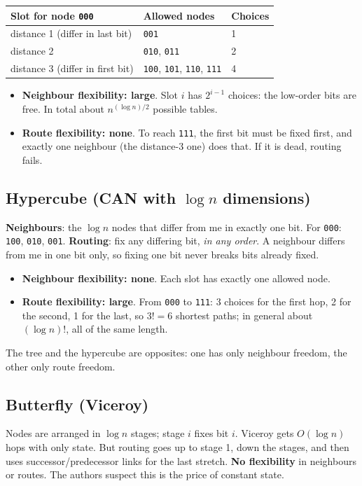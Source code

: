 \begin{center}
\small
\begin{tabular}{@{}lll@{}}
\toprule
Slot for node \texttt{000} & Allowed nodes & Choices\\
\midrule
distance 1 (differ in last bit) & \texttt{001} & 1\\
distance 2 & \texttt{010}, \texttt{011} & 2\\
distance 3 (differ in first bit) & \texttt{100}, \texttt{101}, \texttt{110}, \texttt{111} & 4\\
\bottomrule
\end{tabular}
\end{center}
\begin{itemize}
  \item \textbf{Neighbour flexibility: large}. Slot $i$ has $2^{i-1}$ choices: the low-order bits are free. In total about $n^{(\log n)/2}$ possible tables.
  \item \textbf{Route flexibility: none}. To reach \texttt{111}, the first bit must be fixed first, and exactly one neighbour (the distance-3 one) does that.
        If it is dead, routing fails.
\end{itemize}

\subsection{Hypercube (CAN with $\log n$ dimensions)}
\textbf{Neighbours}: the $\log n$ nodes that differ from me in exactly one bit. For \texttt{000}: \texttt{100}, \texttt{010}, \texttt{001}.
\textbf{Routing}: fix any differing bit, \emph{in any order}. A neighbour differs from me in one bit only, so fixing one bit never breaks bits already fixed.
\begin{itemize}
  \item \textbf{Neighbour flexibility: none}. Each slot has exactly one allowed node.
  \item \textbf{Route flexibility: large}. From \texttt{000} to \texttt{111}: 3 choices for the first hop, 2 for the second, 1 for the last, so $3! = 6$
        shortest paths; in general about $(\log n)!$, all of the same length.
\end{itemize}
The tree and the hypercube are opposites: one has only neighbour freedom, the other only route freedom.

\subsection{Butterfly (Viceroy)}
Nodes are arranged in $\log n$ stages; stage $i$ fixes bit $i$. Viceroy gets $O(\log n)$ hops with only  state. But routing goes up to stage 1,
down the stages, and then uses successor/predecessor links for the last stretch. \textbf{No flexibility} in neighbours or routes. The authors suspect this is the
price of constant state.

